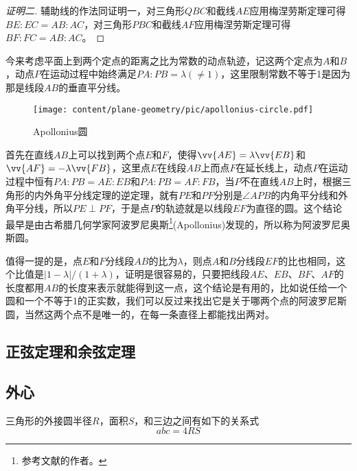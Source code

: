 \begin{proof}[证明二]
  辅助线的作法同证明一，对三角形$QBC$和截线$AE$应用梅涅劳斯定理可得$BE:EC=AB:AC$，对三角形$PBC$和截线$AF$应用梅涅劳斯定理可得$BF:FC=AB:AC$。
\end{proof}

\begin{example}[阿波罗尼奥斯圆]
  今来考虑平面上到两个定点的距离之比为常数的动点轨迹，记这两个定点为$A$和$B$，动点$P$在运动过程中始终满足$PA:PB=\lambda(\neq 1)$，这里限制常数不等于1是因为那是线段$AB$的垂直平分线。

\begin{figure}[htbp]
\centering
\texttt{[image: content/plane-geometry/pic/apollonius-circle.pdf]}
\caption{Apollonius圆}
\label{fig:apollonius-circle}
\end{figure}

 首先在直线$AB$上可以找到两个点$E$和$F$，使得$\vv{AE}=\lambda\vv{EB}$和$\vv{AF}=-\lambda\vv{FB}$，这里点$E$在线段$AB$上而点$F$在延长线上，动点$P$在运动过程中恒有$PA:PB=AE:EB$和$PA:PB=AF:FB$，当$P$不在直线$AB$上时，根据三角形的内外角平分线定理的逆定理，就有$PE$和$PF$分别是$\angle APB$的内角平分线和外角平分线，所以$PE \perp PF$，于是点$P$的轨迹就是以线段$EF$为直径的圆。这个结论最早是由古希腊几何学家阿波罗尼奥斯\footnote{参考文献\cite{conic-sections}的作者。}(Apollonius)发现的，所以称为阿波罗尼奥斯圆。

 值得一提的是，点$E$和$F$分线段$AB$的比为$\lambda$，则点$A$和$B$分线段$EF$的比也相同，这个比值是$|1-\lambda|/(1+\lambda)$，证明是很容易的，只要把线段$AE$、$EB$、$BF$、$AF$的长度都用$AB$的长度来表示就能得到这一点，这个结论是有用的，比如说任给一个圆和一个不等于1的正实数，我们可以反过来找出它是关于哪两个点的阿波罗尼斯圆，当然这两个点不是唯一的，在每一条直径上都能找出两对。
\end{example}

\subsection{正弦定理和余弦定理}
\label{sec:sine-theorem-and-cosine-theorem}

\subsection{外心}
\label{sec:triangle-excenter}

\begin{property}
  \label{ppty:triangle-circumradius-area-sides}
  三角形的外接圆半径$R$，面积$S$，和三边之间有如下的关系式
  \begin{equation}
    \label{eq:triangle-circumradius-area-sides}
    abc = 4RS
  \end{equation}
\end{property}

